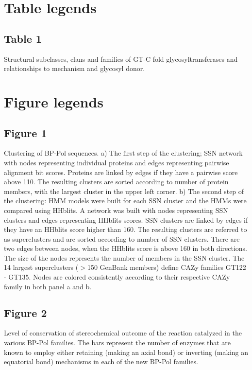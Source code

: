 \documentclass{article}
\begin{document}
\section{Table legends}
\subsection{Table 1}
Structural subclasses, clans and families of GT-C fold glycosyltransferases and relationships to mechanism and glycosyl donor.

\section{Figure legends}

\subsection{Figure 1}
Clustering of BP-Pol sequences. a) The first step of the clustering; SSN network with nodes representing individual proteins and edges representing pairwise alignment bit scores. Proteins are linked by edges if they have a pairwise score above 110. The resulting clusters are sorted according to number of protein members, with the largest cluster in the upper left corner.  b) The second step of the clustering: HMM models were built for each SSN cluster and the HMMs were compared using HHblits. A network was built with nodes representing SSN clusters and edges representing HHblits scores. SSN clusters are linked by edges if they have an HHblits score higher than 160. The resulting clusters are referred to as superclusters and are sorted according to number of SSN clusters. There are two edges between nodes, when the HHblits score is above 160 in both directions. The size of the nodes represents the number of members in the SSN cluster. The 14 largest superclusters ($>$150 GenBank members) define CAZy families GT122 - GT135. Nodes are colored consistently according to their respective CAZy family in both panel a and b.

\subsection{Figure 2}
Level of conservation of stereochemical outcome of the reaction catalyzed in the various BP-Pol families. The bars represent the number of enzymes that are known to employ either retaining (making an axial bond) or inverting (making an equatorial bond) mechanisms in each of the new BP-Pol families.
\end{document}
